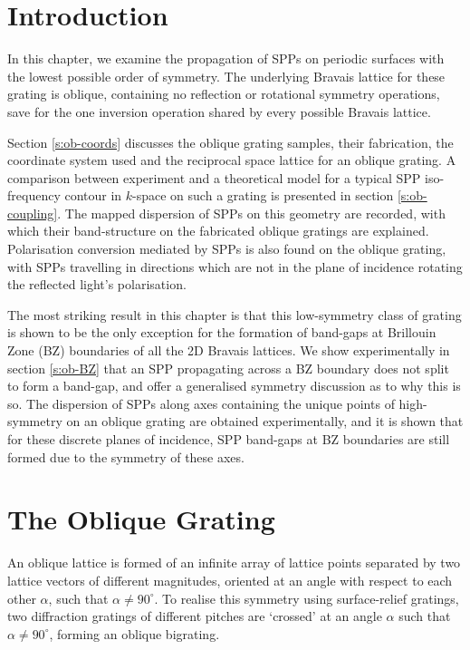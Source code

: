 \section{Introduction}
In this chapter, we examine the propagation of SPPs on periodic surfaces with the lowest possible order of symmetry. The underlying Bravais lattice for these grating is oblique, containing no reflection or rotational symmetry operations, save for the one inversion operation shared by every possible Bravais lattice.

Section \ref{s:ob-coords} discusses the oblique grating samples, their fabrication, the coordinate system used and the reciprocal space lattice for an oblique grating. A comparison between experiment and a theoretical model for a typical SPP iso-frequency contour in $k$-space on such a grating is presented in section \ref{s:ob-coupling}. The mapped dispersion of SPPs on this geometry are recorded, with which their band-structure on the fabricated oblique gratings are explained. Polarisation conversion mediated by SPPs is also found on the oblique grating, with SPPs travelling in directions which are not in the plane of incidence rotating the reflected light's polarisation.

The most striking result in this chapter is that this low-symmetry class of grating is shown to be the only exception for the formation of band-gaps at Brillouin Zone (BZ) boundaries of all the 2D Bravais lattices. We show experimentally in section \ref{s:ob-BZ} that an SPP propagating across a BZ boundary does not split to form a band-gap, and offer a generalised symmetry discussion as to why this is so. The dispersion of SPPs along axes containing the unique points of high-symmetry on an oblique grating are obtained experimentally, and it is shown that for these discrete planes of incidence, SPP band-gaps at BZ boundaries are still formed due to the symmetry of these axes.

\section{The Oblique Grating\label{s:ob-coords}}

An oblique lattice is formed of an infinite array of lattice points separated by two lattice vectors of different magnitudes, oriented at an angle with respect to each other $\alpha$, such that $\alpha \neq 90^\circ$. To realise this symmetry using surface-relief gratings, two diffraction gratings of different pitches are `crossed' at an angle $\alpha$ such that $\alpha\not= 90^\circ$, forming an oblique bigrating.

